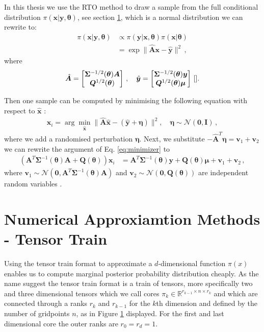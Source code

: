 In this thesis we use the RTO method to draw a sample from the full conditional distribution $\pi( \bm{x}| \bm{y} , \bm{\theta} )$, see section \ref{}, which is a normal distribution we can rewrite to:
\begin{align}
	\pi(\bm{x}|\bm{y}, \bm{\theta} ) &\propto \pi(\bm{y} | \bm{x} , \bm{\theta} ) \pi(\bm{x}| \bm{\theta}) \\
	&= \exp  \lVert \hat{\bm{A}} \bm{x} - \hat{\bm{y}} \rVert^2 \, ,
\end{align}
where 
\begin{align}
	\label{eq:minimizer}
	\hat{\bm{A}} = 
	\begin{bmatrix}
		\bm{\Sigma}^{-1/2}(\bm{\theta})  \bm{A}\\
		\bm{Q}^{1/2}(\bm{\theta}) 
	\end{bmatrix} \, , \quad \hat{\bm{y}} = 
	\begin{bmatrix}
		\bm{\Sigma}^{-1/2}(\bm{\theta})  \bm{y} \\
		\bm{Q}^{1/2}(\bm{\theta}) \bm{\mu}
	\end{bmatrix} \, \text{\cite{}}.
\end{align}

Then one sample can be computed by minimising the following equation with respect to $\hat{\bm{x}}$ :
\begin{align}
	\bm{x}_i = \arg \min_{\hat{\bm{x}}} \lVert \hat{\bm{A}} \hat{\bm{x}} - ( \hat{\bm{y}} + \bm{\eta} ) \rVert^2 , \quad \bm{\eta} \sim \mathcal{N}(\bm{0}, \mathbf{I}) \, ,
\end{align}
where we add a randomised perturbation $\bm{\eta}$.
Next, we substitute $ - \hat{\bm{A}}^T  \bm{\eta}  = \bm{v}_1 + \bm{v}_2$ we can rewrite the argument of Eq. \ref{eq:minimizer} to 
\begin{align}
	\label{eq:RTO}
	(\bm{A}^T \bm{\Sigma}^{-1}(\bm{\theta}) \bm{A}+
	\bm{Q}(\bm{\theta}) ) \bm{x}_i &= \bm{A}^T \bm{\Sigma}^{-1}(\bm{\theta}) \bm{y} +  \bm{Q}(\bm{\theta}) \bm{\mu} + \bm{v}_1 + \bm{v}_2 \,  ,
\end{align}
where $\bm{v}_1 \sim \mathcal{N}(\bm{0}, \bm{A}^T \bm{\Sigma}^{-1}(\bm{\theta}) \bm{A}) $ and $\bm{v}_2 \sim \mathcal{N}(\bm{0}, \bm{Q}(\bm{\theta}) )$ are independent random variables \cite{}.


\section{Numerical Approxiamtion Methods - Tensor Train}
Using the tensor train format to approximate a $d$-dimensional function $\pi(x)$ enables us to compute marginal posterior probability distribution cheaply.
As the name suggest the tensor train format is a train of tensors, more specifically two and three dimensional tensors which we call cores $\pi_{k} \in \mathbb{R}^{r_{k-1} \times n \times r_{k}}$  and which are connected through a ranks $r_{k}$ and $r_{k-1}$ for the $k$th dimension and defined by the number of gridpoints $n$, as in Figure \ref{} displayed.
For the first and last dimensional core the outer ranks are $r_0  = r_d = 1$.




